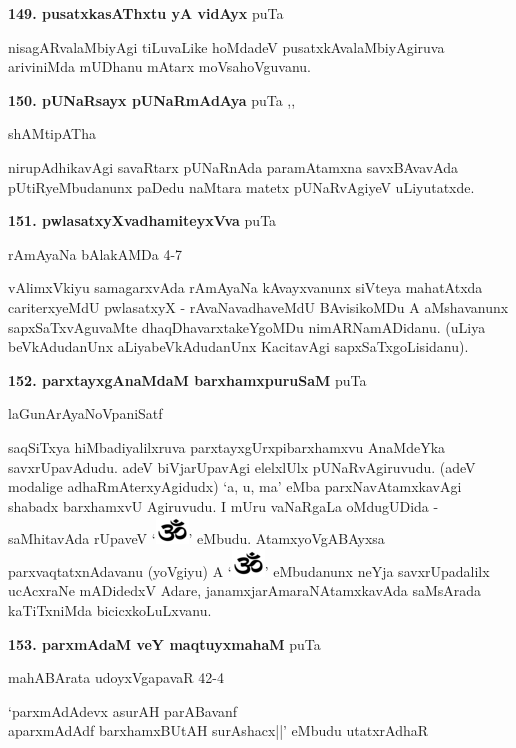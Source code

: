 \medskip
\noindent\textbf{149. pusatxkasAThxtu yA vidAyx} \hfill puTa \pageref{114}

nisagARvalaMbiyAgi tiLuvaLike hoMdadeV pusatxkAvalaMbiyAgiruva ariviniMda mUDhanu mAtarx moVsahoVguvanu.

\medskip
\noindent\textbf{150. pUNaRsayx pUNaRmAdAya} \hfill puTa \pageref{23},\pageref{48a},\pageref{268}

\hfill shAMtipATha

nirupAdhikavAgi savaRtarx pUNaRnAda paramAtamxna savxBAvavAda pUtiRyeMbudanunx paDedu naMtara matetx pUNaRvAgiyeV uLiyutatxde.

\medskip
\noindent\textbf{151. pwlasatxyXvadhamiteyxVva} \hfill puTa \pageref{207c}

\hfill rAmAyaNa bAlakAMDa 4-7

vAlimxVkiyu samagarxvAda rAmAyaNa kAvayxvanunx siVteya mahatAtxda cariterxyeMdU pwlasatxyX - rAvaNavadhaveMdU BAvisikoMDu A aMshavanunx sapxSaTxvAguvaMte dhaqDhavarxtakeYgoMDu nimARNamADidanu. (uLiya beVkAdudanUnx aLiyabeVkAdudanUnx KacitavAgi sapxSaTxgoLisidanu).

\medskip
\noindent\textbf{152. parxtayxgAnaMdaM barxhamxpuruSaM} \hfill puTa \pageref{106a}

\hfill laGunArAyaNoVpaniSatf

saqSiTxya hiMbadiyalilxruva parxtayxgUrxpibarxhamxvu AnaMdeYka savxrUpavAdudu. adeV biVjarUpavAgi elelxlUlx pUNaRvAgiruvudu. (adeV modalige adhaRmAterxyAgidudx) `a, u, ma' eMba parxNavAtamxkavAgi shabadx barxhamxvU Agiruvudu. I mUru vaNaRgaLa oMdugUDida - saMhitavAda rUpaveV `\includegraphics{Om-PNG.eps}' eMbudu. AtamxyoVgABAyxsa parxvaqtatxnAdavanu (yoVgiyu) A `\includegraphics{Om-PNG.eps}' eMbudanunx neYja savxrUpadalilx  ucAcxraNe mADidedxV Adare, janamxjarAmaraNAtamxkavAda saMsArada kaTiTxniMda bicicxkoLuLxvanu. 

\medskip
\noindent\textbf{153. parxmAdaM veY maqtuyxmahaM} \hfill puTa \pageref{126}

\hfill mahABArata udoyxVgapavaR 42-4

\begin{shloka}
`parxmAdAdevx asurAH parABavanf\\
aparxmAdAdf barxhamxBUtAH surAshacx||' eMbudu utatxrAdhaR
\end{shloka}

